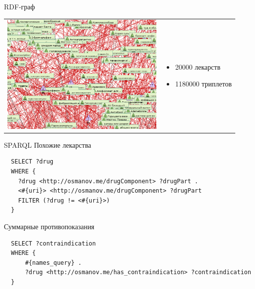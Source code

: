 \documentclass{beamer}
\begin{document}
\begin{frame}[t]{RDF-граф}

\begin{tabular}{l l}
\begin{minipage}{0.75\textwidth}
\includegraphics[width=80mm]{graph.png}
\end{minipage}
&
\begin{minipage}{0.25\textwidth}
\begin{itemize}
\item 20000 лекарств
\item 1180000 триплетов
\end{itemize}
\end{minipage}
\end{tabular}
\end{frame}
\begin{frame}[fragile]{SPARQL}
Похожие лекарства
\begin{lstlisting}
  SELECT ?drug 
  WHERE {
    ?drug <http://osmanov.me/drugComponent> ?drugPart .
    <#{uri}> <http://osmanov.me/drugComponent> ?drugPart
    FILTER (?drug != <#{uri}>)
  }
\end{lstlisting}
Суммарные противопоказания
\begin{lstlisting}
  SELECT ?contraindication
  WHERE {
	  #{names_query} .
	  ?drug <http://osmanov.me/has_contraindication> ?contraindication
  }
\end{lstlisting}
\end{frame}
\end{document}
